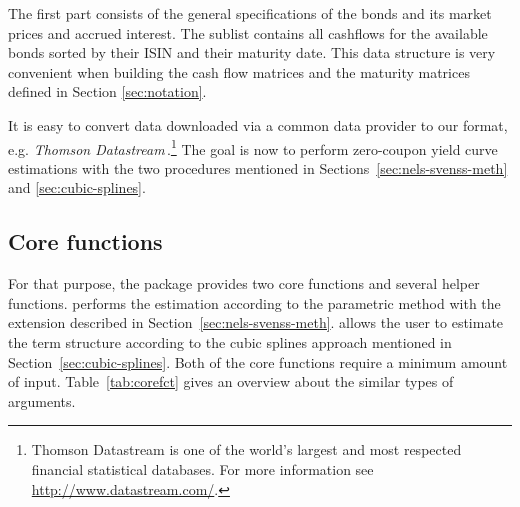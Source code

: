 The first part consists of the general specifications of the bonds and its market prices and accrued interest. The sublist  contains all cashflows for the available bonds sorted by their ISIN and their maturity date. This data structure is very convenient when building the cash flow matrices and the maturity matrices defined in Section \ref{sec:notation}.

It is easy to convert data downloaded via a common data provider to our format, e.g. \emph{Thomson Datastream}\texttrademark\,.\footnote{Thomson Datastream is one of the world's largest and most respected financial statistical databases. For more information see \url{http://www.datastream.com/}.} The goal is now to perform zero-coupon yield curve estimations with the two procedures mentioned in Sections~\ref{sec:nels-svenss-meth} and \ref{sec:cubic-splines}.

\newpage
\subsection{Core functions}
\label{sec:main-functions}

For that purpose, the package  provides two core functions and several helper functions.  performs the estimation according to the parametric \cite{Nelson1987} method with the \cite{Svensson1994} extension described in Section~\ref{sec:nels-svenss-meth}.   allows the user to estimate the term structure according to the \cite{McCulloch1975} cubic splines approach mentioned in Section~\ref{sec:cubic-splines}. Both of the core functions require a minimum amount of input. Table~\ref{tab:corefct} gives an overview about the similar types of arguments.

